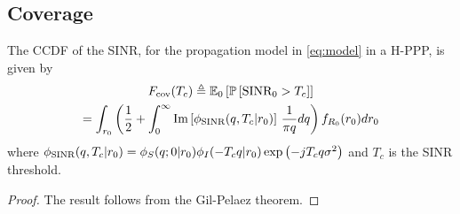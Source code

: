 \subsection{Coverage}
\begin{theorem}\label{eq:cov}
    The CCDF of the SINR, for the propagation model in \eqref{eq:model} in a H-PPP, is given by
{\smalltonormalsize
\begin{multline*}\label{eq:coveq}
        F_{\text{cov}}(T_c) \triangleq \mathbb E_0\left[\mathbb{P}\left[\text{\normalfont SINR}_0 > T_c\right]\right] \\
        =\int_{r_0}\left(\frac{1}{2} + \int_{0}^{\infty} \text{\normalfont Im}\left[\phi_{\text{\normalfont{SINR}}}(q, T_c|r_0)\right]\,\frac{1}{\pi q} dq \right)f_{R_0}(r_0) dr_0
\end{multline*}}where $\phi_{\text{\normalfont{SINR}}}(q, T_c|r_0) = \phi_S(q;0|r_0)  \phi_I(-T_c q|r_0) \exp\left({-jT_cq\sigma^2}\right)$ and $T_c$ is the SINR threshold.
\end{theorem}
\begin{proof}
    The result follows from the Gil-Pelaez theorem.
\end{proof}

